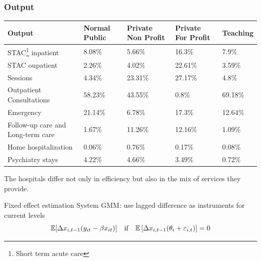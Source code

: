 \documentclass[10pt,mathserif,aspectratio=169]{beamer}
\begin{document}
\begin{frame}
  \frametitle{Output}
  \begin{table} \fontsize{8pt}{10pt}\selectfont
    \begin{tabular}{lllll}
      \toprule
      Output                                         & Normal Public & Private Non Profit & Private For Profit & Teaching \\
      \midrule
      STAC\footnote{Short term acute care} inpatient & 8.08\%        & 5.66\%             & 16.3\%             & 7.9\%    \\
      STAC oupatient                                 & 2.26\%        & 4.02\%             & 22.61\%            & 3.59\%   \\
      Sessions                                       & 4.34\%        & 23.31\%            & 27.17\%            & 4.8\%    \\
      Outpatient Consultations                       & 58.23\%       & 43.55\%            & 0.8\%              & 69.18\%  \\
      Emergency                                      & 21.14\%       & 6.78\%             & 17.3\%             & 12.64\%  \\
      Follow-up care and Long-term care              & 1.67\%        & 11.26\%            & 12.16\%            & 1.09\%   \\
      Home hospitalization                           & 0.06\%        & 0.76\%             & 0.17\%             & 0.08\%   \\
      Psychiatry stays                               & 4.22\%        & 4.66\%             & 3.49\%             & 0.72\%   \\
      \bottomrule
    \end{tabular}
  \end{table}
  The hospitals differ not only in efficiency but also in the mix of services they provide.
\end{frame}
\begin{frame}{Fixed effect estimation}
  System GMM: use lagged difference as instruments for current levels
  \begin{equation*}
    \mathbb{E}[\Delta x_{i,t-1}(y_{it}-\beta x_{it})] \quad \text{if}\quad \mathbb{E}\left[\Delta x_{i,t-1}(\theta_i+\varepsilon_{i,t})\right]=0
  \end{equation*}
\end{frame}
\end{document}
